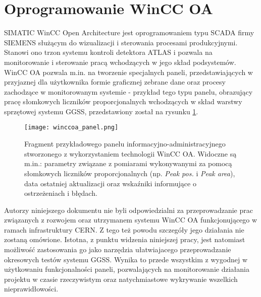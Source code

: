 \section{Oprogramowanie WinCC OA}
SIMATIC WinCC Open Architecture jest oprogramowaniem typu SCADA firmy SIEMENS służącym do wizualizacji i sterowania procesami produkcyjnymi. Stanowi ono trzon systemu kontroli detektora ATLAS i pozwala na monitorowanie i sterowanie pracą wchodzących w jego skład podsystemów. WinCC OA pozwala m.in. na tworzenie specjalnych paneli, przedstawiających w przyjaznej dla użytkownika formie graficznej zebrane dane oraz procesy zachodzące w monitorowanym systemie - przykład tego typu panelu, obrazujący pracę słomkowych liczników proporcjonalnych wchodzących w skład warstwy sprzętowej systemu GGSS, przedstawiony został na rysunku \ref{fig:winccoa_panel_example}.

\begin{figure}[H]
\centering
\texttt{[image: winccoa\_panel.png]}
\caption{Fragment przykładowego panelu informacyjno-administracyjnego stworzonego z wykorzystaniem technologii WinCC OA. Widoczne są m.in.: parametry związane z pomiarami wykonywanymi za pomocą słomkowych liczników proporcjonalnych (np. \emph{Peak pos.} i \emph{Peak area}), data ostatniej aktualizacji oraz wskaźniki informujące o ostrzeżeniach i błędach.}
\label{fig:winccoa_panel_example}
\end{figure}


Autorzy niniejszego dokumentu nie byli odpowiedzialni za przeprowadzanie prac związanych z rozwojem oraz utrzymanem systemu WinCC OA funkcjonującego w ramach infrastruktury CERN. Z tego też powodu szczegóły jego działania nie zostaną omówione. Istotna, z punktu widzenia niniejszej pracy, jest natomiast możliwość zastosowania go jako narzędzia ułatwiajacego przeprowadzanie okresowych testów systemu GGSS. Wynika to przede wszystkim z wygodnej w użytkowaniu funkcjonalności paneli, pozwalających na monitorowanie działania projektu w czasie rzeczywistym oraz natychmiastowe wykrywanie wszelkich nieprawidłowości. 


